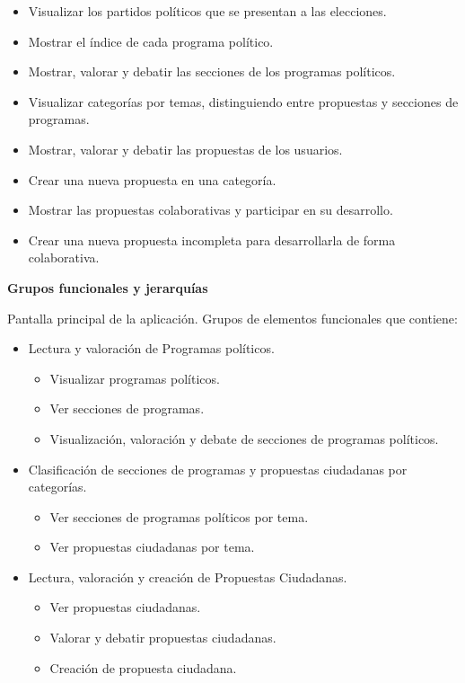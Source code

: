  \begin{itemize}
  \item Visualizar los partidos políticos que se presentan a las elecciones.
  \item Mostrar el índice de cada programa político.
  \item Mostrar, valorar y debatir las secciones de los programas políticos.
  \item Visualizar categorías por temas, distinguiendo entre propuestas y secciones de programas.
  \item Mostrar, valorar y debatir las propuestas de los usuarios.
  \item Crear una nueva propuesta en una categoría.
  \item Mostrar las propuestas colaborativas y participar en su desarrollo.
  \item Crear una nueva propuesta incompleta para desarrollarla de forma colaborativa.
 \end{itemize}

\textbf{Grupos funcionales y jerarquías}

Pantalla principal de la aplicación. Grupos de elementos funcionales que contiene:

\begin{itemize}
 \item Lectura y valoración de Programas políticos.
 \begin{itemize}
  \item Visualizar programas políticos.
  \item Ver secciones de programas.
  \item Visualización, valoración y debate de secciones de programas políticos.
 \end{itemize}
\end{itemize}

\begin{itemize}
 \item Clasificación de secciones de programas y propuestas ciudadanas por categorías.
 \begin{itemize}
  \item Ver secciones de programas políticos por tema.
  \item Ver propuestas ciudadanas por tema.
 \end{itemize}
\end{itemize}

\begin{itemize}
 \item Lectura, valoración y creación de Propuestas Ciudadanas.
 \begin{itemize}
  \item Ver propuestas ciudadanas.
  \item Valorar y debatir propuestas ciudadanas.
  \item Creación de propuesta ciudadana.
 \end{itemize}
\end{itemize}

